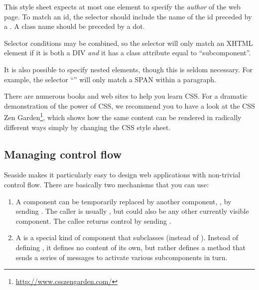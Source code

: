 \documentclass[a4paper,10pt,twoside]{book}
\begin{document}
This style sheet expects at most one element to specify the \emph{author} of the web page.
To match an id, the selector  should include the name of the id preceded by a \ct{#}.
A class name should be preceded by a dot.


Selector conditions may be combined, so the selector  will only match an XHTML element if it is both a DIV \emph{and} it has a class attribute equal to ``subcomponent''.

It is also possible to specify nested elements, though this is seldom necessary.
For example, the selector ``'' will only match a SPAN within a paragraph.

There are numerous books and web sites to help you learn CSS.
For a dramatic demonstration of the power of CSS, we recommend you to have a look at the CSS Zen Garden\footnote{\url{http://www.csszengarden.com/}}, which shows how the same content can be rendered in radically different ways simply by changing the CSS style sheet.

\subsection{Managing control flow}

Seaside makes it particularly easy to design web applications with non-trivial control flow.
There are basically two mechanisms that you can use:

\begin{enumerate}
  \item A component  can be temporarily replaced by another component, , by sending .
  The caller is usually , but could also be any other currently visible component.
  The callee returns control by sending .

  \item A  is a special kind of component that subclasses  (instead of ). \label{sec:task}
  Instead of defining , it defines no content of its own, but rather defines a  method that sends a series of  messages to activate various subcomponents in turn.
\end{enumerate}
\end{document}
